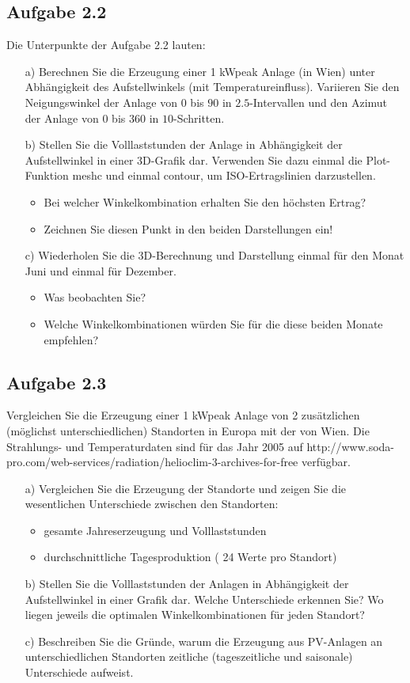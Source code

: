 \documentclass[a4paper,12pt]{article}
\begin{document}
	\subsection{Aufgabe 2.2}
	Die Unterpunkte der Aufgabe 2.2 lauten:
	\begin{itemize}
		\item[a)] Berechnen Sie die Erzeugung einer 1 kWpeak Anlage (in Wien) unter Abhängigkeit
des Aufstellwinkels (mit Temperatureinfluss). Variieren Sie den Neigungswinkel
der Anlage von $0$ bis $90$ in $2.5$-Intervallen und den Azimut der Anlage von $0$ bis
$360$ in $10$-Schritten.
		\item[b)] Stellen Sie die Volllaststunden der Anlage in Abhängigkeit der Aufstellwinkel in
einer 3D-Grafik dar. Verwenden Sie dazu einmal die Plot-Funktion meshc und
einmal contour, um ISO-Ertragslinien darzustellen.
\begin{itemize}
\item Bei welcher Winkelkombination erhalten Sie den höchsten Ertrag?
\item Zeichnen Sie diesen Punkt in den beiden Darstellungen ein!
\end{itemize}
		\item[c)] Wiederholen Sie die 3D-Berechnung und Darstellung einmal für den Monat Juni
und einmal für Dezember.
\begin{itemize}
\item Was beobachten Sie?
\item Welche Winkelkombinationen würden Sie für die diese beiden Monate empfehlen?
\end{itemize}
	\end{itemize}
	\subsection{Aufgabe 2.3}
	Vergleichen Sie die Erzeugung einer 1 kWpeak Anlage von 2 zusätzlichen (möglichst
unterschiedlichen) Standorten in Europa mit der von Wien. Die Strahlungs- und
Temperaturdaten sind für das Jahr 2005 auf
http://www.soda-pro.com/web-services/radiation/helioclim-3-archives-for-free verfügbar.
	\begin{itemize}
		\item[a)]Vergleichen Sie die Erzeugung der Standorte und zeigen Sie die wesentlichen
Unterschiede zwischen den Standorten:
\begin{itemize}
\item gesamte Jahreserzeugung und Volllaststunden
\item durchschnittliche Tagesproduktion ( 24 Werte pro Standort)
\end{itemize}
	\item[b)] Stellen Sie die Volllaststunden der Anlagen in Abhängigkeit der Aufstellwinkel in
einer Grafik dar. Welche Unterschiede erkennen Sie? Wo liegen jeweils die
optimalen Winkelkombinationen für jeden Standort?
	\item[c)] Beschreiben Sie die Gründe, warum die Erzeugung aus PV-Anlagen an
unterschiedlichen Standorten zeitliche (tageszeitliche und saisonale) Unterschiede
aufweist.
	\end{itemize}
	\newpage
\end{document}
